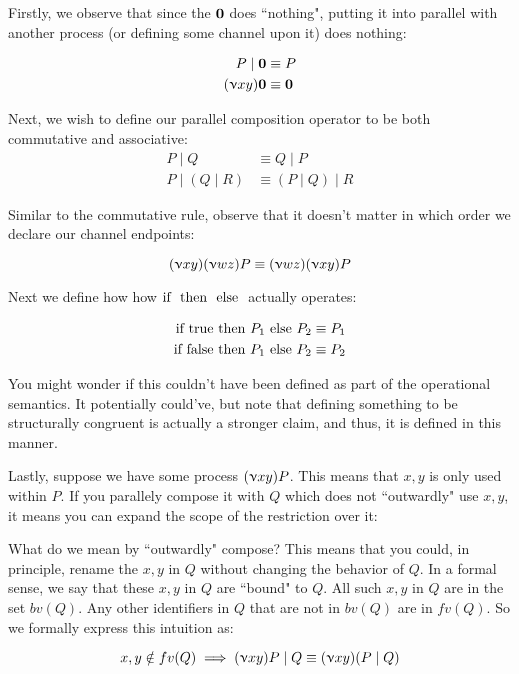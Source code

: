 Firstly, we observe that since the $\textbf{0}$ does ``nothing", putting it into parallel with another process (or defining some channel upon it) does nothing:

\begin{align*}
P \mid \textbf{0} &\equiv P \\
(\upnu xy) \textbf{0} &\equiv \textbf{0}
\end{align*}

Next, we wish to define our parallel composition operator to be both commutative and associative:
\begin{align*}
P \mid Q &\equiv Q \mid P \\
P \mid (Q \mid R) &\equiv (P \mid Q) \mid R
\end{align*}

Similar to the commutative rule, observe that it doesn't matter in which order we declare our channel endpoints:

$$
(\upnu xy)(\upnu wz)P \equiv (\upnu wz)(\upnu xy)P
$$

Next we define how how $\text{if }  \text{ then }  \text{ else }$ actually operates:

\begin{align*}
\text{if } \text{true} \text{ then } P_1 \text{ else } P_2 &\equiv P_1 \\
\text{if } \text{false} \text{ then } P_1 \text{ else } P_2 &\equiv P_2
\end{align*}

You might wonder if this couldn't have been defined as part of the operational semantics. It potentially could've, but note that defining something to be structurally congruent is actually a stronger claim, and thus, it is defined in this manner.

Lastly, suppose we have some process $(\upnu xy)P$. This means that $x,y$ is only used within $P$. If you parallely compose it with $Q$ which does not ``outwardly" use $x,y$, it means you can expand the scope of the restriction over it:


What do we mean by ``outwardly" compose? This means that you could, in principle, rename the $x,y$ in $Q$ without changing the behavior of $Q$. In a formal sense, we say that these $x,y$ in $Q$ are ``bound" to $Q$. All such $x,y$ in $Q$ are in the set $bv(Q)$. Any other identifiers in $Q$ that are not in $bv(Q)$ are in $fv(Q)$. So we formally express this intuition as:

$$
x,y \notin fv(Q) \implies (\upnu xy)P \mid Q \equiv (\upnu xy)(P \mid Q)
$$

